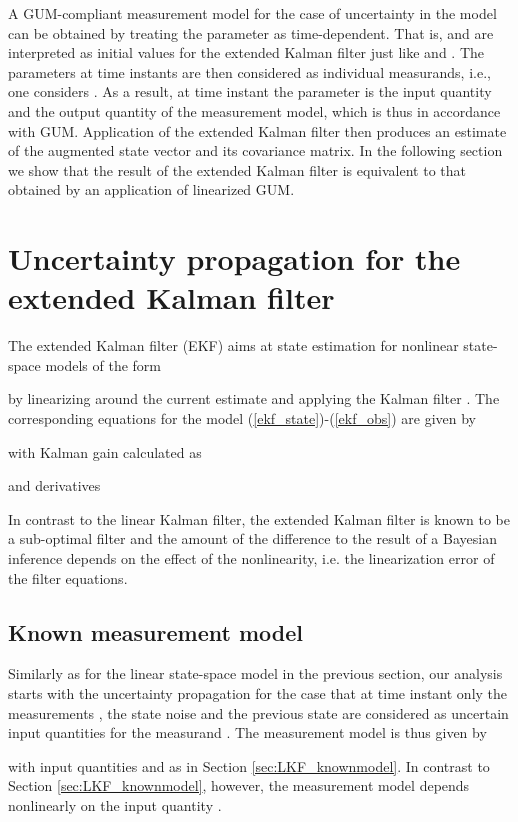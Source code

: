 \documentclass[10pt]{article}
\begin{document}
\begin{spacing}{1}
A GUM-compliant measurement model for the case of uncertainty in the model can be obtained by treating the parameter  as time-dependent. That is,  and  are interpreted as initial values for the extended Kalman filter just like  and . The parameters  at time instants  are then considered as individual measurands, i.e., one considers . As a result, at time instant  the parameter  is the input quantity and  the output quantity of the measurement model, which is thus in accordance with GUM. Application of the extended Kalman filter then produces an estimate of the augmented state vector and its covariance matrix. In the following section we show that the result of the extended Kalman filter is equivalent to that obtained by an application of linearized GUM.


\section{Uncertainty propagation for the extended Kalman filter}
\label{sec:EKF}

The extended Kalman filter (EKF) aims at state estimation for nonlinear state-space models of the form

by linearizing around the current estimate  and applying the Kalman filter \cite{Julier:2004go}. The corresponding equations for the model (\ref{ekf_state})-(\ref{ekf_obs}) are given by

with Kalman gain  calculated as

and derivatives

In contrast to the linear Kalman filter, the extended Kalman filter is known to be a sub-optimal filter \cite{Arulampalam:2002hg} and the amount of the difference to the result of a Bayesian inference depends on the effect of the nonlinearity, i.e. the linearization error of the filter equations.

\subsection{Known measurement model}
Similarly as for the linear state-space model in the previous section, our analysis starts with the uncertainty propagation for the case that at time instant  only the measurements , the state noise  and the previous state  are considered as uncertain input quantities for the measurand . The measurement model is thus given by

with input quantities  and  as in Section \ref{sec:LKF_knownmodel}. 
In contrast to Section \ref{sec:LKF_knownmodel}, however, the measurement model depends nonlinearly on the input quantity . 


\end{spacing}
\end{document}
